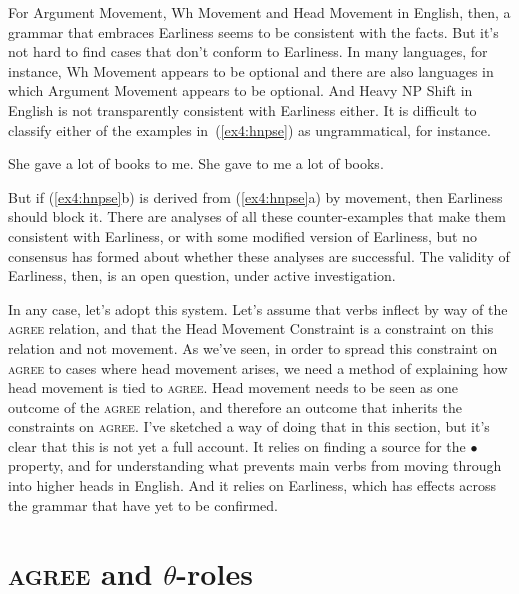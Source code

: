 For Argument Movement, Wh Movement and Head Movement in English, then, a grammar that embraces Earliness seems to be consistent with the facts. But it's not hard to find cases that don't conform to Earliness. In many languages, for instance, Wh Movement appears to be optional and there are also languages in which Argument Movement appears to be optional. And Heavy NP Shift in English is not transparently consistent with Earliness either. It is difficult to classify either of the examples in~(\ref{ex4:hnpse}) as ungrammatical, for instance.
\begin{exe}
	\ex \label{ex4:hnpse}
	\begin{xlist}
		\ex She gave a lot of books to me.
		\ex She gave to me a lot of books.
	\end{xlist}
\end{exe}
But if (\ref{ex4:hnpse}b) is derived from (\ref{ex4:hnpse}a) by movement, then Earliness should block it. There are analyses of all these counter-examples that make them consistent with Earliness, or with some modified version of Earliness, but no consensus has formed about whether these analyses are successful. The validity of Earliness, then, is an open question, under active investigation.

In any case, let's adopt this system. Let's assume that verbs inflect by way of the \textsc{agree} relation, and that the Head Movement Constraint is a constraint on this relation and not movement. As we've seen, in order to spread this constraint on \textsc{agree} to cases where head movement arises, we need a method of explaining how head movement is tied to \textsc{agree}. Head movement needs to be seen as one outcome of the \textsc{agree} relation, and therefore an outcome that inherits the constraints on \textsc{agree}. I've sketched a way of doing that in this section, but it's clear that this is not yet a full account. It relies on finding a source for the $\bullet$ property, and for understanding what prevents main verbs from moving through  into higher heads in English. And it relies on Earliness, which has effects across the grammar that have yet to be confirmed.

\section{\textsc{agree} and $\theta$-roles} %
\label{sec:theta}

